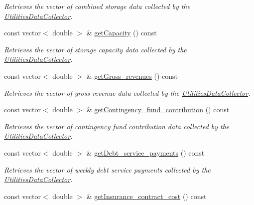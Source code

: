 \begin{DoxyCompactItemize}
\begin{DoxyCompactList}\small\item\em Retrieves the vector of combined storage data collected by the {\ttfamily \mbox{\hyperlink{classUtilitiesDataCollector}{Utilities\+Data\+Collector}}}. \end{DoxyCompactList}\item 
const vector$<$ double $>$ \& \mbox{\hyperlink{classUtilitiesDataCollector_a48369552a48650ea015b3ff18da5175f}{get\+Capacity}} () const
\begin{DoxyCompactList}\small\item\em Retrieves the vector of storage capacity data collected by the {\ttfamily \mbox{\hyperlink{classUtilitiesDataCollector}{Utilities\+Data\+Collector}}}. \end{DoxyCompactList}\item 
const vector$<$ double $>$ \& \mbox{\hyperlink{classUtilitiesDataCollector_adb6e9b219255d8bb1fb323d6e5582e5c}{get\+Gross\+\_\+revenues}} () const
\begin{DoxyCompactList}\small\item\em Retrieves the vector of gross revenue data collected by the {\ttfamily \mbox{\hyperlink{classUtilitiesDataCollector}{Utilities\+Data\+Collector}}}. \end{DoxyCompactList}\item 
const vector$<$ double $>$ \& \mbox{\hyperlink{classUtilitiesDataCollector_a9cb52112e6175775842474e80a37023d}{get\+Contingency\+\_\+fund\+\_\+contribution}} () const
\begin{DoxyCompactList}\small\item\em Retrieves the vector of contingency fund contribution data collected by the {\ttfamily \mbox{\hyperlink{classUtilitiesDataCollector}{Utilities\+Data\+Collector}}}. \end{DoxyCompactList}\item 
const vector$<$ double $>$ \& \mbox{\hyperlink{classUtilitiesDataCollector_a13635135acfe49ec8eb0b587af41c9f1}{get\+Debt\+\_\+service\+\_\+payments}} () const
\begin{DoxyCompactList}\small\item\em Retrieves the vector of weekly debt service payments collected by the {\ttfamily \mbox{\hyperlink{classUtilitiesDataCollector}{Utilities\+Data\+Collector}}}. \end{DoxyCompactList}\item 
const vector$<$ double $>$ \& \mbox{\hyperlink{classUtilitiesDataCollector_a96d4541f68916996c0ac74d7d4ad6474}{get\+Insurance\+\_\+contract\+\_\+cost}} () const

\end{DoxyCompactItemize}

